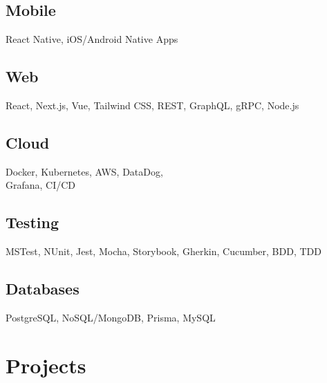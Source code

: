 \documentclass{article}
\begin{document}
\begin{paracol}{2}
\begin{leftcolumn}
    \subsection{Mobile}
    React Native, iOS/Android Native Apps

    \vspace{0.5em}

    \subsection{Web}
    React, Next.js, Vue, Tailwind CSS, REST, GraphQL, gRPC, Node.js

    \vspace{0.5em}

    \subsection{Cloud}
    Docker, Kubernetes, AWS, DataDog,\\
    Grafana, CI/CD

    \vspace{0.5em}

    \subsection{Testing}
    MSTest, NUnit, Jest, Mocha, Storybook, Gherkin, Cucumber, BDD, TDD

    \pagebreak

    \subsection{Databases}
    PostgreSQL, NoSQL/MongoDB, Prisma, MySQL

    \section{Projects}


\end{leftcolumn}
\end{paracol}
\end{document}
